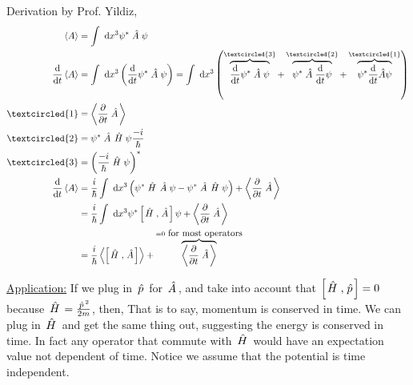 \documentclass{school-22.101-notes}
\begin{document}
Derivation by Prof. Yildiz,
\begin{align}
\expect{A} &= \int \dx^3 \psi^* \Ahat \psi \\
\ddt \expect{A} &= \int \dx^3 \left( \ddt \psi^* \Ahat \psi \right) = \int \dx^3 \left( \overbrace{\ddt \psi^* \Ahat \psi}^{\textcircled{3}} + \overbrace{\psi^* \Ahat \ddt \psi}^{\textcircled{2}} + \overbrace{\psi^* \ddt \hat{A} \psi}^{\textcircled{1}} \right) \\
\textcircled{1} &= \expect{\ppt \Ahat} \\
\textcircled{2} &= \psi^* \Ahat \Hhat \psi \frac{-i}{\hbar}  \\
\textcircled{3} &= \left( \frac{-i}{\hbar}\Hhat \psi \right)^* \\
\ddt \expect{A} &= \frac{i}{\hbar} \int \dx^3 \left( \psi^* \Hhat \Ahat \psi  - \psi^* \Ahat \Hhat \psi \right) + \expect{\ppt \Ahat} \\
&= \frac{i}{\hbar} \int \dx^3 \psi^* \left[ \Hhat, \Ahat \right] \psi + \expect{\ppt \Ahat} \\
&= \frac{i}{\hbar} \expect{ \left[ \Hhat, \Ahat \right] } + \overbrace{\expect{\ppt \Ahat}}^{=0\mbox{ for most operators}} 
\end{align}

\uline{Application:} If we plug in $\left. \hat{p} \right.$ for $\left. \hat{A} \right.$, and take into account that $\left[ \left. \hat{H} \right., \left. \hat{p} \right. \right] = 0$ because $\left. \hat{H} \right. = \frac{\left. \hat{p} \right.^2}{2m}$, then,
That is to say, momentum is conserved in time. We can plug in $\left. \hat{H} \right.$ and get the same thing out, suggesting the energy is conserved in time. In fact any operator that commute with $\left. \hat{H} \right.$ would have an expectation value not dependent of time.  Notice we assume that the potential is time independent. 
\end{document}
